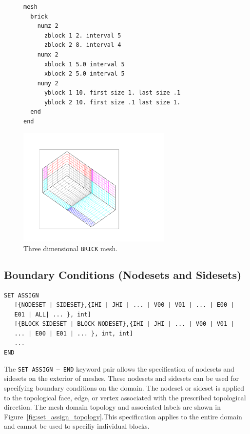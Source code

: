 \begin{figure}[htbp]
\centering
  \begin{minipage}[c]{0.4\linewidth}
    \centering
{\ttfamily \begin{verbatim}










mesh
  brick
    numz 2
      zblock 1 2. interval 5
      zblock 2 8. interval 4
    numx 2
      xblock 1 5.0 interval 5
      xblock 2 5.0 interval 5
    numy 2
      yblock 1 10. first size 1. last size .1
      yblock 2 10. first size .1 last size 1.
  end
end
\end{verbatim}}
  \end{minipage}%
  \hfil
  \begin{minipage}[c]{0.6\linewidth}
    \centering
      \includegraphics[width=3.0in]{brick}
  \end{minipage}
  \caption{Three dimensional \texttt{BRICK} mesh.}
  \label{fig:brick1}
\end{figure}


\clearpage
\subsection{Boundary Conditions (Nodesets and Sidesets)}
\label{sec:nodesets-sidests}

{\ttfamily \small \begin{verbatim}
SET ASSIGN 
   [{NODESET | SIDESET},{IHI | JHI | ... | V00 | V01 | ... | E00 | 
   E01 | ALL| ... }, int]
   [{BLOCK SIDESET | BLOCK NODESET},{IHI | JHI | ... | V00 | V01 | 
   ... | E00 | E01 | ... }, int, int]
   ...
END
\end{verbatim}
}

The \texttt{SET ASSIGN -- END} keyword pair allows the specification
of nodesets and sidesets on the exterior of meshes.  These
nodesets and sidesets can be used for specifying boundary conditions
on the domain. The nodeset or sideset is applied to the topological
face, edge, or vertex associated with the prescribed topological
direction. The mesh domain topology and associated labels are
shown in Figure~\ref{fig:set_assign_topology}.This specification
applies to the entire  domain and cannot be used to
specifiy individual blocks.

